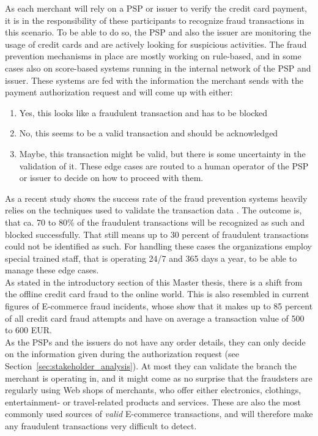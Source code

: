 As each merchant will rely on a \gls{PSP} or issuer to verify the credit card payment, it is in the responsibility of these participants to recognize fraud transactions in this scenario. To be able to do so, the \gls{PSP} and also the issuer are monitoring the usage of credit cards and are actively looking for suspicious activities. The fraud prevention mechanisms in place are mostly working on rule-based, and in some cases also on score-based systems running in the internal network of the \gls{PSP} and issuer. These systems are fed with the information the merchant sends with the payment authorization request and will come up with either:\@

\begin{enumerate}
  \item Yes, this looks like a fraudulent transaction and has to be blocked
  \item No, this seems to be a valid transaction and should be acknowledged
  \item Maybe, this transaction might be valid, but there is some uncertainty in the validation of it. These edge cases are routed to a human operator of the \gls{PSP} or issuer to decide on how to proceed with them.
\end{enumerate}

As a recent study shows the success rate of the fraud prevention systems heavily relies on the techniques used to validate the transaction data \citep{rana2015survey}. The outcome is, that ca. 70 to 80\% of the fraudulent transactions will be recognized as such and blocked successfully. That still means up to 30 percent of fraudulent transactions could not be identified as such. For handling these cases the organizations employ special trained staff, that is operating 24/7 and 365 days a year, to be able to manage these edge cases. \\

As stated in the introductory section of this Master thesis, there is a shift from the offline credit card fraud to the online world. This is also resembled in current figures of \gls{E-commerce} fraud incidents, whose show that it makes up to 85 percent of all credit card fraud attempts and have on average a transaction value of 500 to 600 EUR.\\

As the \gls{PSP}s and the issuers do not have any order details, they can only decide on the information given during the authorization request (see Section~\ref{sec:stakeholder_analysis}). At most they can validate the branch the merchant is operating in, and it might come as no surprise that the fraudsters are regularly using Web shops of merchants, who offer either electronics, clothings, entertainment- or travel-related products and services. These are also the most commonly used sources of \emph{valid} \gls{E-commerce} transactions, and will therefore make any fraudulent transactions very difficult to detect. \\

